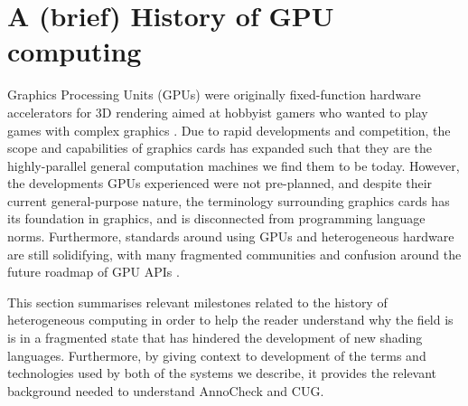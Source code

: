 \documentclass[a4paper,12pt,twoside,openright]{report}
\begin{document}


\section{A (brief) History of GPU computing}

\label{sec:history_gpu}

Graphics Processing Units (GPUs) were originally fixed-function hardware
accelerators for 3D rendering aimed at hobbyist gamers who wanted to play games
with complex graphics \cite{GLQuake}. Due to rapid developments and
competition, the scope and capabilities of graphics cards has expanded such
that they are the highly-parallel general computation machines we find them to
be today. However, the developments GPUs experienced were not pre-planned, and
despite their current general-purpose nature, the terminology surrounding
graphics cards has its foundation in graphics, and is disconnected from
programming language norms. Furthermore, standards around using GPUs and
heterogeneous hardware are still solidifying, with many fragmented communities
and confusion around the future roadmap of GPU APIs \cite{TODO}.

This section summarises relevant milestones related to the history of
heterogeneous computing in order to help the reader understand why the field is
is in a fragmented state that has hindered the development of new shading
languages. Furthermore, by giving context to development of the terms and
technologies used by both of the systems we describe, it provides the relevant
background needed to understand AnnoCheck and CUG.
\end{document}
